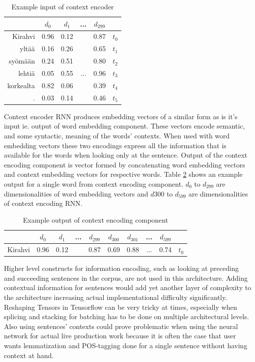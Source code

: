 \documentclass[12pt,a4paper,english
]{tutthesis}
\begin{document}
\begin{table}[htbp]
\caption{Example input of context encoder}
\label{table:context_encoder_input}
\centering
\begin{tabular}{|r|c|c|c|c|l|}
  \hline
  & $d_0$ & $d_1$ & ... & $d_{299}$ & \\
  \hline
  \hline
  Kirahvi & 0.96 & 0.12 & & 0.87 & $t_0$ \\
  yltää & 0.16 & 0.26 & & 0.65 & $t_1$ \\
  syömään & 0.24 & 0.51 & & 0.80 & $t_2$ \\
  lehtiä & 0.05 & 0.55 & ... & 0.96 & $t_3$ \\
  korkealta & 0.82 & 0.06 & & 0.39 & $t_4$ \\
  . & 0.03 & 0.14 & & 0.46 & $t_5$ \\
  \hline
\end{tabular}
\end{table}

Context encoder RNN produces embedding vectors of a similar form as is it's input ie. output of word embedding component. These vectors encode semantic, and some syntactic, meaning of the words' contexts. When used with word embedding vectors these two encodings express all the information that is available for the words when looking only at the sentence. Output of the context encoding component is vector formed by concatenating word embedding vectors and context embedding vectors for respective words. Table \ref{table:context_encoding_component_output} shows an example output for a single word from context encoding component. $d_0$ to $d_{299}$ are dimensionalities of word embedding vectors and $d{300}$ to $d_{599}$ are dimensionalities of context encoding RNN.

\begin{table}[htbp]
\caption{Example output of context encoding component}
\label{table:context_encoding_component_output}
\centering
\begin{tabular}{|r|c|c|c|c|c|c|c|c|l|}
  \hline
  & $d_0$ & $d_1$ & ... & $d_{299}$ & $d_{300}$ & $d_{301}$ & ... & $d_{599}$ & \\
  \hline
  \hline
  Kirahvi & 0.96 & 0.12 & & 0.87 & 0.69 & 0.88 & ... & 0.74 & $t_0$ \\
  \hline
\end{tabular}
\end{table}

Higher level constructs for information encoding, such as looking at preceding and succeeding sentences in the corpus, are not used in this architecture. Adding contextual information for sentences would add yet another layer of complexity to the architecture increasing actual implementational difficulty significantly. Reshaping Tensors in Tensorflow can be very tricky at times, especially when splicing and stacking for batching has to be done on multiple architectural levels. Also using sentences' contexts could prove problematic when using the neural network for actual live production work because it is often the case that user wants lemmatization and POS-tagging done for a single sentence without having context at hand.
\end{document}
